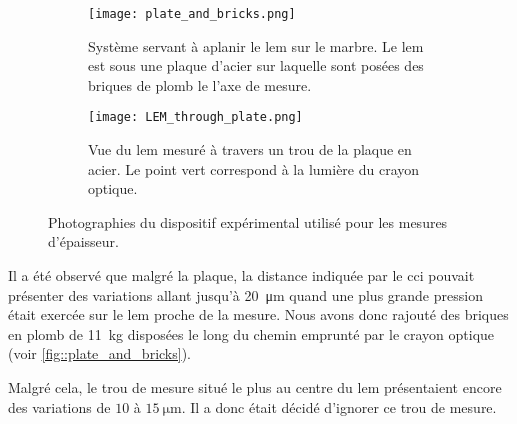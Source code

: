                     \begin{figure}[htpb]
                        \begin{subfigure}[t]{0.5\textwidth}
                            \texttt{[image: plate\_and\_bricks.png]}
                            \caption[Système servant à aplanir le \gls{lem} sur le marbre.]{Système servant à aplanir le \gls{lem} sur le marbre. Le \gls{lem} est sous une plaque d'acier sur laquelle sont posées des briques de plomb le l'axe de mesure.}
                            \label{fig::plate_and_bricks}
                        \end{subfigure}
                        \hfill
                        \begin{subfigure}[t]{0.395\textwidth}
                            \texttt{[image: LEM\_through\_plate.png]}
                            \caption[Vue du \gls{lem} mesuré à travers un trou de la plaque en acier.]{Vue du \gls{lem} mesuré à travers un trou de la plaque en acier. Le point vert correspond à la lumière du crayon optique.}
                            \label{fig::LEM_through_plate}
                        \end{subfigure}
                        \caption{Photographies du dispositif expérimental utilisé pour les mesures d'épaisseur.}
                        \label{fig::dispositif_experimental}
                    \end{figure}
                    Il a été observé que malgré la plaque, la distance indiquée par le \gls{cci} pouvait présenter des variations allant jusqu'à \SI{20}{\micro\meter} quand une plus grande pression était exercée sur le \gls{lem} proche de la mesure. Nous avons donc rajouté des briques en plomb de \SI{11}{\kilo\gram} disposées le long du chemin emprunté par le crayon optique (voir \autoref{fig::plate_and_bricks}). %
                    
                    Malgré cela, le trou de mesure situé le plus au centre du \gls{lem} présentaient encore des variations de $10$ à $\SI{15}{\micro\meter}$. Il a donc était décidé d'ignorer ce trou de mesure.
                    
